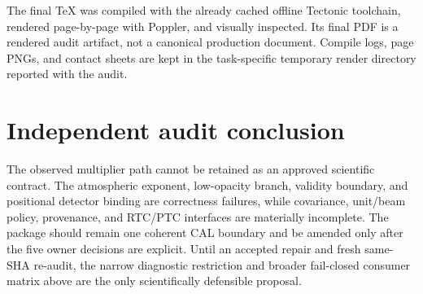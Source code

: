 \documentclass[11pt]{article}
\begin{document}
The final TeX was compiled with the already cached offline Tectonic toolchain,
rendered page-by-page with Poppler, and visually inspected.  Its final PDF is a
rendered audit artifact, not a canonical production document.  Compile logs,
page PNGs, and contact sheets are kept in the task-specific temporary render
directory reported with the audit.

\section{Independent audit conclusion}

The observed multiplier path cannot be retained as an approved scientific
contract.  The atmospheric exponent, low-opacity branch, validity boundary,
and positional detector binding are correctness failures, while covariance,
unit/beam policy, provenance, and RTC/PTC interfaces are materially incomplete.
The package should remain one coherent CAL boundary and be amended only after
the five owner decisions are explicit.  Until an accepted repair and fresh
same-SHA re-audit, the narrow diagnostic restriction and broader fail-closed
consumer matrix above are the only scientifically defensible proposal.
\end{document}

